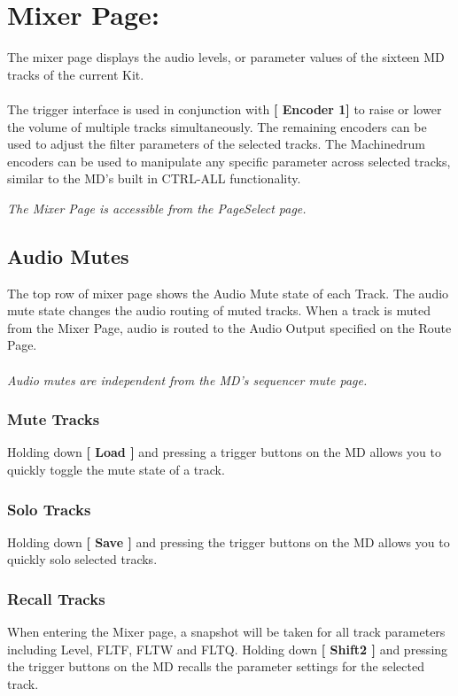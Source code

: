 \chapter{Mixer Page:}
The mixer page displays the audio levels, or parameter values of the sixteen MD tracks of the current Kit.
\\\\
The trigger interface is used in conjunction with \textbf{[ Encoder 1]} to raise or lower the volume of multiple tracks simultaneously. The remaining encoders can be used to adjust the filter parameters of the selected tracks. The Machinedrum encoders can be used to manipulate any specific parameter across selected tracks, similar to the MD's built in CTRL-ALL functionality.


\textit{The Mixer Page is accessible from the PageSelect page.}


\section{Audio Mutes}

The top row of mixer page shows the Audio Mute state of each Track. The audio mute state changes the audio routing of muted tracks. When a track is muted from the Mixer Page, audio is routed to the Audio Output specified on the Route Page.\\
\\
\textit{Audio mutes are independent from the MD's sequencer mute page.}
\\
\subsection{Mute Tracks}
Holding down \textbf{[ Load ]} and pressing a trigger buttons on the MD allows you to quickly toggle the mute state of a track.
\subsection{Solo Tracks}
Holding down \textbf{[ Save ]} and pressing the trigger buttons on the MD allows you to quickly solo selected tracks.
\subsection{Recall Tracks}
When entering the Mixer page, a snapshot will be taken for all track parameters including Level, FLTF, FLTW and FLTQ.
Holding down \textbf{[ Shift2 ]} and pressing the trigger buttons on the MD recalls the parameter settings for the selected track.
